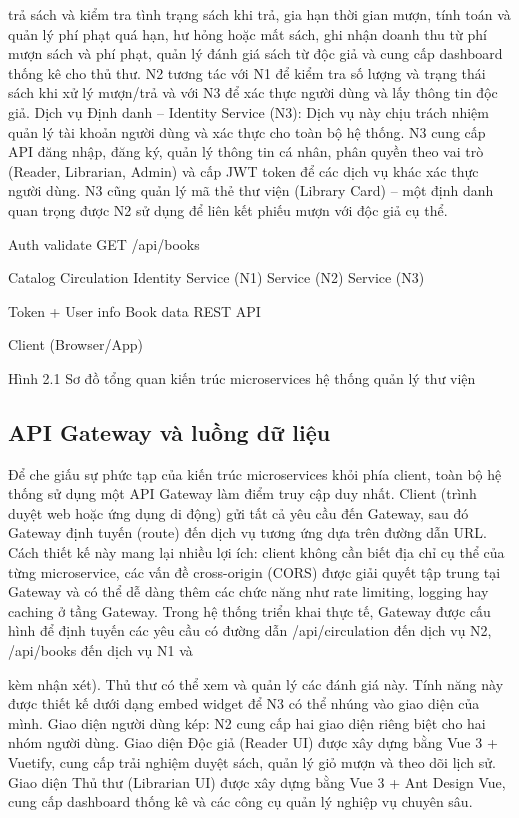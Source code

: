 trả sách và kiểm tra tình trạng sách khi trả, gia hạn thời gian mượn, tính toán và quản lý phí phạt quá hạn, hư hỏng hoặc mất sách, ghi nhận doanh thu từ phí mượn sách và phí phạt, quản lý đánh giá sách từ độc giả và cung cấp dashboard thống kê cho thủ thư. N2 tương tác với N1 để kiểm tra số lượng và trạng thái sách khi xử lý mượn/trả và với N3 để xác thực người dùng và lấy thông tin độc giả. Dịch vụ Định danh – Identity Service (N3): Dịch vụ này chịu trách nhiệm quản lý tài khoản người dùng và xác thực cho toàn bộ hệ thống. N3 cung cấp API đăng nhập, đăng ký, quản lý thông tin cá nhân, phân quyền theo vai trò (Reader, Librarian, Admin) và cấp JWT token để các dịch vụ khác xác thực người dùng. N3 cũng quản lý mã thẻ thư viện (Library Card) – một định danh quan trọng được N2 sử dụng để liên kết phiếu mượn với độc giả cụ thể.

Auth validate GET /api/books

Catalog Circulation Identity Service (N1) Service (N2) Service (N3)

Token + User info Book data REST API

Client (Browser/App)

Hình 2.1 Sơ đồ tổng quan kiến trúc microservices hệ thống quản lý thư viện

\subsection{API Gateway và luồng dữ liệu}

Để che giấu sự phức tạp của kiến trúc microservices khỏi phía client, toàn bộ hệ thống sử dụng một API Gateway làm điểm truy cập duy nhất. Client (trình duyệt web hoặc ứng dụng di động) gửi tất cả yêu cầu đến Gateway, sau đó Gateway định tuyến (route) đến dịch vụ tương ứng dựa trên đường dẫn URL. Cách thiết kế này mang lại nhiều lợi ích: client không cần biết địa chỉ cụ thể của từng microservice, các vấn đề cross-origin (CORS) được giải quyết tập trung tại Gateway và có thể dễ dàng thêm các chức năng như rate limiting, logging hay caching ở tầng Gateway. Trong hệ thống triển khai thực tế, Gateway được cấu hình để định tuyến các yêu cầu có đường dẫn /api/circulation đến dịch vụ N2, /api/books đến dịch vụ N1 và

kèm nhận xét). Thủ thư có thể xem và quản lý các đánh giá này. Tính năng này được thiết kế dưới dạng embed widget để N3 có thể nhúng vào giao diện của mình. Giao diện người dùng kép: N2 cung cấp hai giao diện riêng biệt cho hai nhóm người dùng. Giao diện Độc giả (Reader UI) được xây dựng bằng Vue 3 + Vuetify, cung cấp trải nghiệm duyệt sách, quản lý giỏ mượn và theo dõi lịch sử. Giao diện Thủ thư (Librarian UI) được xây dựng bằng Vue 3 + Ant Design Vue, cung cấp dashboard thống kê và các công cụ quản lý nghiệp vụ chuyên sâu.


